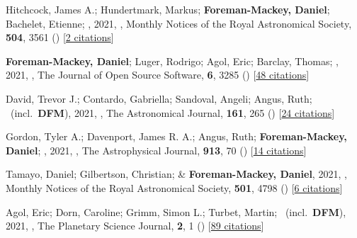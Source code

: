 \item[{\color{numcolor}\scriptsize67}] Hitchcock, James A.; Hundertmark, Markus; \textbf{Foreman-Mackey, Daniel}; Bachelet, Etienne; \etal, 2021, , Monthly Notices of the Royal Astronomical Society, \textbf{504}, 3561 () [\href{https://ui.adsabs.harvard.edu/abs/2021MNRAS.504.3561H}{2 citations}]

\item[{\color{numcolor}\scriptsize66}] \textbf{Foreman-Mackey, Daniel}; Luger, Rodrigo; Agol, Eric; Barclay, Thomas; \etal, 2021, , The Journal of Open Source Software, \textbf{6}, 3285 () [\href{https://ui.adsabs.harvard.edu/abs/2021JOSS....6.3285F}{48 citations}]

\item[{\color{numcolor}\scriptsize65}] David, Trevor J.; Contardo, Gabriella; Sandoval, Angeli; Angus, Ruth; \etal\ (incl.\ \textbf{DFM}), 2021, , The Astronomical Journal, \textbf{161}, 265 () [\href{https://ui.adsabs.harvard.edu/abs/2021AJ....161..265D}{24 citations}]

\item[{\color{numcolor}\scriptsize64}] Gordon, Tyler A.; Davenport, James R. A.; Angus, Ruth; \textbf{Foreman-Mackey, Daniel}; \etal, 2021, , The Astrophysical Journal, \textbf{913}, 70 () [\href{https://ui.adsabs.harvard.edu/abs/2021ApJ...913...70G}{14 citations}]

\item[{\color{numcolor}\scriptsize63}] Tamayo, Daniel; Gilbertson, Christian; \& \textbf{Foreman-Mackey, Daniel}, 2021, , Monthly Notices of the Royal Astronomical Society, \textbf{501}, 4798 () [\href{https://ui.adsabs.harvard.edu/abs/2021MNRAS.501.4798T}{6 citations}]

\item[{\color{numcolor}\scriptsize62}] Agol, Eric; Dorn, Caroline; Grimm, Simon L.; Turbet, Martin; \etal\ (incl.\ \textbf{DFM}), 2021, , The Planetary Science Journal, \textbf{2}, 1 () [\href{https://ui.adsabs.harvard.edu/abs/2021PSJ.....2....1A}{89 citations}]

